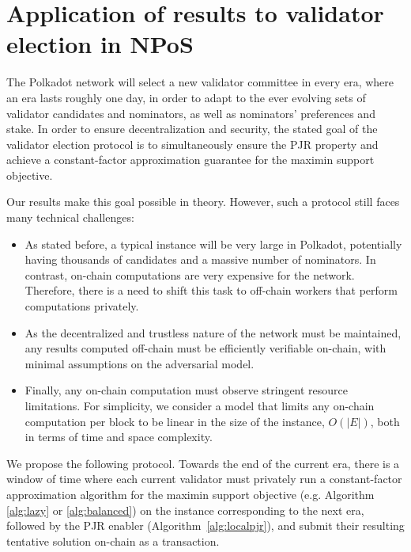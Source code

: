 
\section{Application of results to validator election in NPoS}\label{s:objectives}

The Polkadot network will select a new validator committee in every era, where an era lasts roughly one day, in order to adapt to the ever evolving sets of validator candidates and nominators, as well as nominators' preferences and stake. 
In order to ensure decentralization and security, the stated goal of the validator election protocol is to simultaneously ensure the PJR property and achieve a constant-factor approximation guarantee for the maximin support objective. 

Our results make this goal possible in theory. However, such a protocol still faces many technical challenges:

\begin{itemize}
    \item As stated before, a typical instance will be very large in Polkadot, potentially having thousands of candidates and a massive number of nominators. In contrast, on-chain computations are very expensive for the network. Therefore, there is a need to shift this task to off-chain workers that perform computations privately. 
    \item As the decentralized and trustless nature of the network must be maintained, any results computed off-chain must be efficiently verifiable on-chain, with minimal assumptions on the adversarial model.
    \item Finally, any on-chain computation must observe stringent resource limitations. For simplicity, we consider a model that limits any on-chain computation per block to be linear in the size of the instance, $O(|E|)$, both in terms of time and space complexity.
\end{itemize}


We propose the following protocol. 
Towards the end of the current era, there is a window of time where each current validator must privately run a constant-factor approximation algorithm for the maximin support objective (e.g. Algorithm \ref{alg:lazy} or \ref{alg:balanced}) on the instance corresponding to the next era, followed by the PJR enabler (Algorithm~\ref{alg:localpjr}), and submit their resulting tentative solution on-chain as a transaction. 

